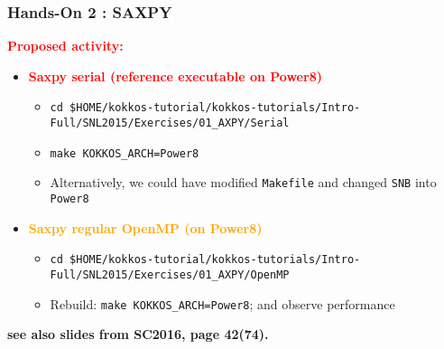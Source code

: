 \begin{frame}[fragile=singleslide]
  \frametitle{Hands-On 2 : SAXPY}

  {\large \textcolor{red}{\bf Proposed activity:}}
  \begin{itemize}
  \item \textcolor{red}{\textbf{Saxpy serial (reference executable on Power8)}}
    \begin{itemize}
    \item \texttt{cd \$HOME/kokkos-tutorial/kokkos-tutorials/Intro-Full/SNL2015/Exercises/01\_AXPY/Serial}
    \item \texttt{make KOKKOS\_ARCH=Power8}
    \item Alternatively, we could have modified \texttt{Makefile} and changed \texttt{SNB} into \texttt{Power8}
    \end{itemize}
  \item \textcolor{orange}{\textbf{Saxpy regular OpenMP (on Power8)}}
    \begin{itemize}
    \item \texttt{cd \$HOME/kokkos-tutorial/kokkos-tutorials/Intro-Full/SNL2015/Exercises/01\_AXPY/OpenMP}
    \item Rebuild: \texttt{make KOKKOS\_ARCH=Power8}; and observe performance
    \end{itemize}
  \end{itemize}

  \textbf{see also slides from SC2016, page 42(74).}
  
\end{frame}

